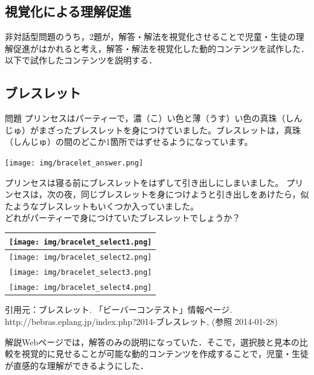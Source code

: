 \documentclass[a4paper]{jarticle}
\begin{document}
\begin{multicols}{2}
\section{視覚化による理解促進}
非対話型問題のうち，2題が，解答・解法を視覚化させることで児童・生徒の理解促進がはかれると考え，解答・解法を視覚化した動的コンテンツを試作した．以下で試作したコンテンツを説明する．

\subsection{ブレスレット}
\begin{itembox}[l]{問題}
プリンセスはパーティーで，濃（こ）い色と薄（うす）い色の真珠（しんじゅ）がまざったブレスレットを身につけていました。ブレスレットは，真珠（しんじゅ）の間のどこか1箇所ではずせるようになっています。
\begin{center}
\texttt{[image: img/bracelet\_answer.png]}
\end{center}
プリンセスは寝る前にブレスレットをはずして引き出しにしまいました。
プリンセスは，次の夜，同じブレスレットを身につけようと引き出しをあけたら，似たようなブレスレットもいくつか入っていました。\\
どれがパーティーで身につけていたブレスレットでしょうか？
\begin{center}
\begin{tabular}{|p{5cm}|} \hline
\texttt{[image: img/bracelet\_select1.png]}\\[0.5cm] \hline
\texttt{[image: img/bracelet\_select2.png]}\\[0.5cm] \hline
\texttt{[image: img/bracelet\_select3.png]}\\[0.5cm] \hline
\texttt{[image: img/bracelet\_select4.png]}\\[0.5cm] \hline
\end{tabular}
\end{center}
{ \scriptsize 引用元：ブレスレット. 「ビーバーコンテスト」情報ページ. http://bebras.eplang.jp/index.php?2014-ブレスレット, (参照 2014-01-28)}
\end{itembox}

解説Webページでは，解答のみの説明になっていた．そこで，選択肢と見本の比較を視覚的に見せることが可能な動的コンテンツを作成することで，児童・生徒が直感的な理解ができるようにした．
\\
\\
\\
\\

\end{multicols}
\end{document}
